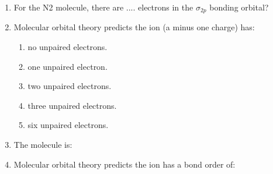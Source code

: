 \documentclass[main.tex]{subfiles}
\begin{document}
\begin{fullwidth}
\begin{multicols}{2}
\begin{enumerate}[resume]
\item For the N2 molecule, there are .... electrons in the $\sigma_{2p}$  bonding orbital?
\begin{enumerate}[label=(\alph*)]\vspace{-0.5cm}
\end{enumerate}\vspace{-0.5cm}
	
		
\item	Molecular orbital theory predicts the  ion (a minus one charge) has:
\begin{enumerate}[label=(\alph*)] 
\item 	no unpaired electrons.
\item 	one unpaired electron.
\item 	two unpaired electrons.
\item 	three unpaired electrons.
\item 	six unpaired electrons.
\end{enumerate} 
	
\item The  molecule is:
\begin{enumerate}[label=(\alph*)]\vspace{-0.5cm}
\end{enumerate}\vspace{-0.5cm}
		
\item	Molecular orbital theory predicts the  ion has a bond order of:
\begin{enumerate}[label=(\alph*)]\vspace{-0.5cm}
\end{enumerate}\vspace{-0.5cm}
		

\end{enumerate}
\end{multicols}
\end{fullwidth}
\end{document}
